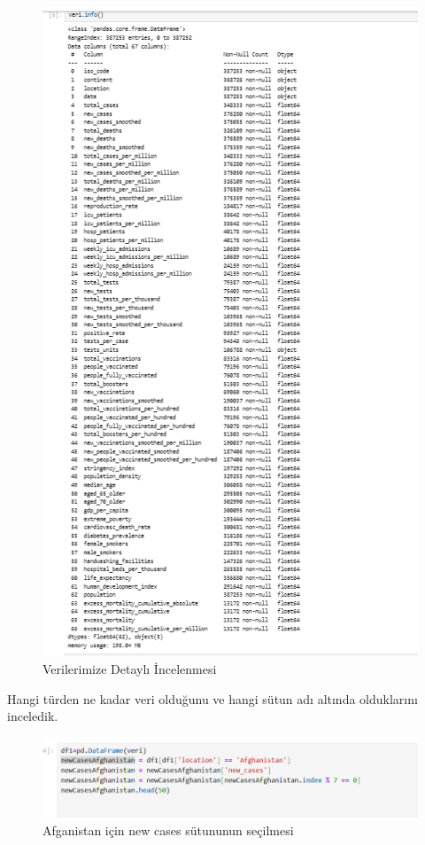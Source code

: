 \documentclass[12pt, a4paper]{article}
\begin{document}
	\begin{figure}[!htbp] 
		
		\centering
		\includegraphics[angle=0, width=\textwidth]{2.png}
		\caption{Verilerimize Detaylı İncelenmesi}
	\end{figure}
	\newpage Hangi türden ne kadar veri olduğunu ve hangi sütun adı altında olduklarını inceledik. 
	\begin{figure}[!htbp] 
		
		\centering
		\includegraphics[angle=0, width=\textwidth]{3.png}
		\caption{Afganistan için new cases sütununun seçilmesi}
	\end{figure}
\end{document}
